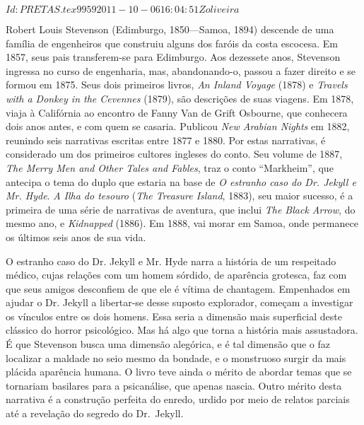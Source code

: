 \SVN $Id: PRETAS.tex 9959 2011-10-06 16:04:51Z oliveira $
\begin{resumopage}

\item[Robert Louis Stevenson] (Edimburgo, 1850---Samoa, 1894) 
descende de uma família de engenheiros que construiu alguns dos 
faróis da costa escocesa. Em 1857, seus pais transferem-se para 
Edimburgo. Aos dezessete anos, Stevenson ingressa no curso de 
engenharia, mas, abandonando-o, passou a fazer direito e se formou em 1875. 
Seus dois primeiros livros, \textit{An Inland Voyage} (1878) e \textit{Travels with a Donkey in the 
Cevennes} (1879), são descrições de suas viagens. Em 1878, viaja 
à Califórnia ao encontro de Fanny Van de Grift Osbourne, que 
conhecera dois anos antes, e com quem se casaria. Publicou \textit{New 
Arabian Nights} em 1882, reunindo seis narrativas escritas 
entre 1877 e 1880. Por estas narrativas, é considerado um dos 
primeiros cultores ingleses do conto. Seu volume de 1887, 
\textit{The Merry Men and Other Tales and Fables}, traz o conto ``Markheim'', 
que antecipa o tema do duplo que estaria na base de \textit{O estranho caso 
do Dr. Jekyll e Mr. Hyde}. \textit{A Ilha do tesouro} (\textit{The Treasure Island}, 
1883), seu maior sucesso, é a primeira de uma série de narrativas 
de aventura, que inclui \textit{The Black Arrow}, do mesmo ano, e \textit{Kidnapped} 
(1886). Em 1888, vai morar em Samoa, onde permanece os últimos seis anos de sua vida.  

\item[O estranho caso do Dr. Jekyll e Mr. Hyde] narra a história 
de um respeitado médico, cujas relações com um homem sórdido, 
de aparência grotesca, faz com que seus amigos desconfiem de que 
ele é vítima de chantagem. Empenhados em ajudar o Dr. Jekyll
a libertar-se desse suposto explorador, começam a investigar os 
vínculos entre os dois homens. Essa seria a dimensão mais 
superficial deste clássico do horror psicológico.
Mas há algo que torna a história mais assustadora. É que Stevenson
busca uma dimensão alegórica, e é tal dimensão que o faz localizar 
a maldade no seio mesmo da bondade, e o monstruoso surgir da mais 
plácida aparência humana. O livro teve ainda o mérito de abordar 
temas que se tornariam basilares para a psicanálise, que apenas
nascia. Outro mérito desta narrativa é a construção perfeita 
do enredo, urdido por meio de relatos parciais até a revelação 
do segredo do Dr.~Jekyll. 
        

\end{resumopage}
